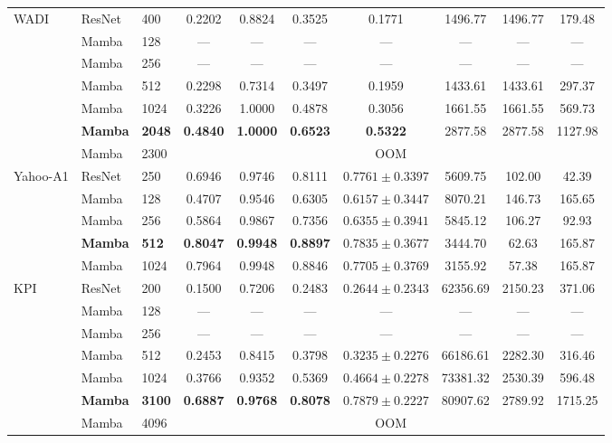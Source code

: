 \documentclass[runningheads]{llncs}
\begin{document}
\begin{table}[H]
{\begin{tabular}{lllccccccc}
\multirow{7}{*}{WADI}
 & ResNet & 400   & 0.2202 & 0.8824 & 0.3525 & 0.1771 & 1496.77 & 1496.77 & 179.48 \\
 & Mamba  & 128   & \textsf{---} & \textsf{---} & \textsf{---} & \textsf{---} & \textsf{---} & \textsf{---} & \textsf{---} \\
 & Mamba  & 256   & \textsf{---} & \textsf{---} & \textsf{---} & \textsf{---} & \textsf{---} & \textsf{---} & \textsf{---} \\
 & Mamba  & 512   & 0.2298 & 0.7314 & 0.3497 & 0.1959 & 1433.61 & 1433.61 & 297.37 \\
 & Mamba  & 1024  & 0.3226 & 1.0000 & 0.4878 & 0.3056 & 1661.55 & 1661.55 & 569.73 \\
 & \textbf{Mamba}  & \textbf{2048}  & \textbf{0.4840} & \textbf{1.0000} & \textbf{0.6523} & \textbf{0.5322} & 2877.58 & 2877.58 & 1127.98 \\
 & Mamba  & 2300  & \multicolumn{7}{c}{\textsf{OOM}} \\
\midrule

\multirow{5}{*}{Yahoo-A1}
 & ResNet & 250   & 0.6946 & 0.9746 & 0.8111 & $0.7761\pm0.3397$ &  5609.75 & 102.00 &  42.39 \\
 & Mamba  & 128   & 0.4707 & 0.9546 & 0.6305 & $0.6157\pm0.3447$ &  8070.21 & 146.73 & 165.65 \\
 & Mamba  & 256   & 0.5864 & 0.9867 & 0.7356 & $0.6355\pm0.3941$ &  5845.12 & 106.27 &  92.93 \\
 & \textbf{Mamba}  & \textbf{512}   & \textbf{0.8047} & \textbf{0.9948} & \textbf{0.8897} & $\mathbf{0.7835\pm0.3677}$ &  3444.70 &  62.63 & 165.87 \\
 & Mamba  & 1024  & 0.7964 & 0.9948 & 0.8846 & $0.7705\pm0.3769$ &  3155.92 &  57.38 & 165.87 \\
\midrule

\multirow{7}{*}{KPI}
 & ResNet & 200   & 0.1500 & 0.7206 & 0.2483 & $0.2644\pm0.2343$ & 62356.69 & 2150.23 &  371.06 \\
 & Mamba  & 128   & \textsf{---} & \textsf{---} & \textsf{---} & \textsf{---} & \textsf{---} & \textsf{---} & \textsf{---} \\
 & Mamba  & 256   & \textsf{---} & \textsf{---} & \textsf{---} & \textsf{---} & \textsf{---} & \textsf{---} & \textsf{---} \\
 & Mamba  & 512   & 0.2453 & 0.8415 & 0.3798 & $0.3235\pm0.2276$ & 66186.61 & 2282.30 &  316.46 \\
 & Mamba  & 1024  & 0.3766 & 0.9352 & 0.5369 & $0.4664\pm0.2278$ & 73381.32 & 2530.39 &  596.48 \\
 & \textbf{Mamba}  & \textbf{3100}  & \textbf{0.6887} & \textbf{0.9768} & \textbf{0.8078} & $\mathbf{0.7879\pm0.2227}$ & 80907.62 & 2789.92 & 1715.25 \\
 & Mamba  & 4096  & \multicolumn{7}{c}{\textsf{OOM}} \\

\bottomrule
\end{tabular}%
}
\end{table}
\end{document}
